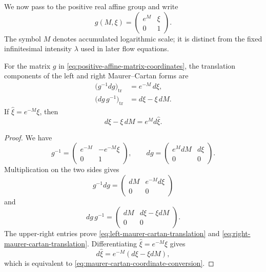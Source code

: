 We now pass to the positive real affine group and write
\begin{equation}
  g(M,\xi)
  =\begin{pmatrix}e^M&\xi\\0&1\end{pmatrix}.
  \label{eq:positive-affine-matrix-coordinates}
\end{equation}
The symbol $M$ denotes accumulated logarithmic scale; it is distinct from the
fixed infinitesimal intensity $\lambda$ used in later flow equations.

\begin{proposition}
\label{prop:left-right-affine-differentials}
For the matrix $g$ in \eqref{eq:positive-affine-matrix-coordinates}, the
translation components of the left and right Maurer--Cartan forms are
\begin{align}
  \bigl(g^{-1}dg\bigr)_{\mathrm{tr}}
    &=e^{-M}\,d\xi,
  \label{eq:left-maurer-cartan-translation}\\
  \bigl(dg\,g^{-1}\bigr)_{\mathrm{tr}}
    &=d\xi-\xi\,dM.
  \label{eq:right-maurer-cartan-translation}
\end{align}
If $\widehat\xi=e^{-M}\xi$, then
\begin{equation}
  d\xi-\xi\,dM=e^M d\widehat\xi.
  \label{eq:maurer-cartan-coordinate-conversion}
\end{equation}
\end{proposition}

\begin{proof}
We have
\[
  g^{-1}
  =\begin{pmatrix}
      e^{-M}&-e^{-M}\xi\\0&1
    \end{pmatrix},
  \qquad
  dg
  =\begin{pmatrix}
      e^M dM&d\xi\\0&0
    \end{pmatrix}.
\]
Multiplication on the two sides gives
\[
  g^{-1}dg
  =\begin{pmatrix}
      dM&e^{-M}d\xi\\0&0
    \end{pmatrix}
\]
and
\[
  dg\,g^{-1}
  =\begin{pmatrix}
      dM&d\xi-\xi dM\\0&0
    \end{pmatrix}.
\]
The upper-right entries prove
\eqref{eq:left-maurer-cartan-translation} and
\eqref{eq:right-maurer-cartan-translation}.  Differentiating
$\widehat\xi=e^{-M}\xi$ gives
\[
  d\widehat\xi=e^{-M}(d\xi-\xi dM),
\]
which is equivalent to
\eqref{eq:maurer-cartan-coordinate-conversion}.
\end{proof}

